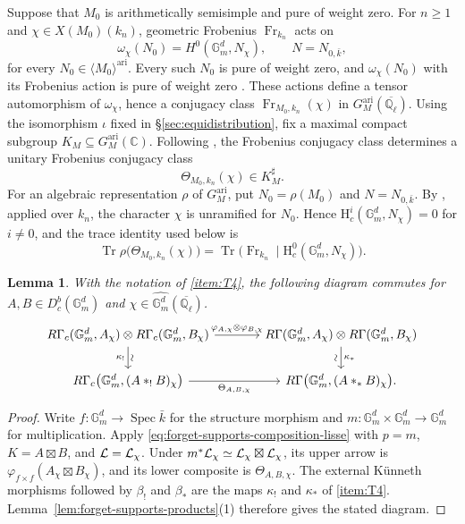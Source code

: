 \documentclass[12pt,reqno]{amsart}
\theoremstyle{definition}
\theoremstyle{plain}
\newtheorem{lem}[para]{Lemma}
\theoremstyle{definition}
\theoremstyle{remark}
\newcommand{\bbC}{\mathbb{C}}  \newcommand{\bbD}{\mathbb{D}}
\newcommand{\bbG}{\mathbb{G}}  \newcommand{\bbH}{\mathbb{H}}
\newcommand{\bbQ}{\mathbb{Q}}  \newcommand{\bbR}{\mathbb{R}}
\newcommand{\HH}{\mathrm{H}}  \newcommand{\JJ}{\mathrm{J}}
\newcommand{\ol}[1]{\overline{#1}}
\newcommand{\Ql}{\bbQ_{\ell}}
\newcommand{\Db}{D^b_c}
\newcommand{\Gm}{\bbG_m}
\begin{document}
\begin{enumerate}[label=\textup{(T\arabic*)}, ref=\textup{(T\arabic*)}]
Suppose that \(M_0\) is arithmetically semisimple and pure of weight zero.  For \(n\ge1\) and
\(\chi\in X(M_0)(k_n)\), geometric Frobenius \(\operatorname{Fr}_{k_n}\) acts on
\[
        \omega_\chi(N_0)=H^0(\Gm^d,N_\chi),
        \qquad N=N_{0,\bar k},
\]
for every \(N_0\in\langle M_0\rangle^{\mathrm{ari}}\).  Every such \(N_0\) is pure of weight zero, and
\(\omega_\chi(N_0)\) with its Frobenius action is pure of weight zero
\cite[Th.~3.33, \S3.9]{ForeyFresanKowalski2021}.  These actions define a tensor automorphism of
\(\omega_\chi\), hence a conjugacy class
\(\operatorname{Fr}_{M_0,k_n}(\chi)\) in \(G_M^{\mathrm{ari}}(\ol\Ql)\).  Using the isomorphism
\(\iota\) fixed in \S\ref{sec:equidistribution}, fix a maximal compact subgroup
\(K_M\subseteq G_M^{\mathrm{ari}}(\bbC)\).  Following
\cite[\S3.9]{ForeyFresanKowalski2021}, the Frobenius conjugacy class determines a unitary Frobenius
conjugacy class
\[
        \Theta_{M_0,k_n}(\chi)\in K_M^\sharp.
\]
For an algebraic representation \(\rho\) of \(G_M^{\mathrm{ari}}\), put \(N_0=\rho(M_0)\) and
\(N=N_{0,\bar k}\).  By \cite[Lem.~3.35(2)]{ForeyFresanKowalski2021}, applied over \(k_n\), the
character \(\chi\) is unramified for \(N_0\).  Hence
\(\HH^i_c(\Gm^d,N_\chi)=0\) for \(i\ne0\), and the trace identity used below is
\[
 \operatorname{Tr}\rho\bigl(\Theta_{M_0,k_n}(\chi)\bigr)
 =\operatorname{Tr}\bigl(\operatorname{Fr}_{k_n}\mid\HH^0_c(\Gm^d,N_\chi)\bigr).
\]

\end{enumerate}

\begin{lem}
\label{lem:comparison-monoidal}
With the notation of \ref{item:T4}, the following diagram commutes for \(A,B\in\Db(\Gm^d)\) and
\(\chi\in\widehat{\Gm^d}(\ol\Ql)\).
\[
\begin{tikzcd}[column sep=large]
R\Gamma_c(\Gm^d,A_\chi)\otimes R\Gamma_c(\Gm^d,B_\chi)
    \arrow[r,"\varphi_{A,\chi}\otimes\varphi_{B,\chi}"]
    \arrow[d,"\kappa_!"',"\rotatebox{90}{\(\sim\)}"]
& R\Gamma(\Gm^d,A_\chi)\otimes R\Gamma(\Gm^d,B_\chi)
    \arrow[d,"\kappa_*","\rotatebox{90}{\(\sim\)}"'] \\
R\Gamma_c\bigl(\Gm^d,(A\ast_!B)_\chi\bigr)
    \arrow[r,"\Theta_{A,B,\chi}"']
& R\Gamma\bigl(\Gm^d,(A\ast_*B)_\chi\bigr).
\end{tikzcd}
\]
\end{lem}

\begin{proof}
Write \(f\colon \Gm^d\to\operatorname{Spec}\bar k\) for the structure morphism and
\(m\colon \Gm^d\times \Gm^d\to \Gm^d\) for multiplication.  Apply
\eqref{eq:forget-supports-composition-lisse} with \(p=m\), \(K=A\boxtimes B\), and
\(\mathcal{L}=\mathcal{L}_\chi\).  Under \(m^*\mathcal{L}_\chi\simeq\mathcal{L}_\chi\boxtimes\mathcal{L}_\chi\), its upper arrow is
\(\varphi_{f\times f}(A_\chi\boxtimes B_\chi)\), and its lower composite is
\(\Theta_{A,B,\chi}\).  The external K\"unneth morphisms followed by \(\beta_!\) and \(\beta_*\) are
the maps \(\kappa_!\) and \(\kappa_*\) of \ref{item:T4}.  Lemma~\ref{lem:forget-supports-products}(1)
therefore gives the stated diagram.
\end{proof}
\end{document}
